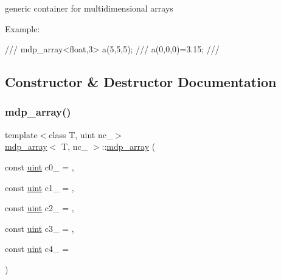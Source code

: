 generic container for multidimensional arrays 

Example\+: \begin{DoxyVerb}///    mdp_array<float,3> a(5,5,5);
///    a(0,0,0)=3.15;
/// \end{DoxyVerb}
 

\subsection{Constructor \& Destructor Documentation}
\mbox{\label{classmdp__array_a231c442576ed1a88e333fb88bcedef41}} 
\subsubsection{\texorpdfstring{mdp\+\_\+array()}{mdp\_array()}\hspace{0.1cm}{\footnotesize\ttfamily [1/5]}}
{\footnotesize\ttfamily template$<$class T, uint nc\+\_\+$>$ \\
\hyperlink{classmdp__array}{mdp\+\_\+array}$<$ T, nc\+\_\+ $>$\+::\hyperlink{classmdp__array}{mdp\+\_\+array} (\begin{DoxyParamCaption}\item[{const \hyperlink{mdp__global__vars_8h_a91ad9478d81a7aaf2593e8d9c3d06a14}{uint}}]{c0\+\_\+ = {},  }\item[{const \hyperlink{mdp__global__vars_8h_a91ad9478d81a7aaf2593e8d9c3d06a14}{uint}}]{c1\+\_\+ = {},  }\item[{const \hyperlink{mdp__global__vars_8h_a91ad9478d81a7aaf2593e8d9c3d06a14}{uint}}]{c2\+\_\+ = {},  }\item[{const \hyperlink{mdp__global__vars_8h_a91ad9478d81a7aaf2593e8d9c3d06a14}{uint}}]{c3\+\_\+ = {},  }\item[{const \hyperlink{mdp__global__vars_8h_a91ad9478d81a7aaf2593e8d9c3d06a14}{uint}}]{c4\+\_\+ = {} }\end{DoxyParamCaption})\hspace{0.3cm}{\ttfamily [inline]}}

\mbox{\label{classmdp__array_a7bdd0c532c8517bf46bceab7c48f3186}} 
